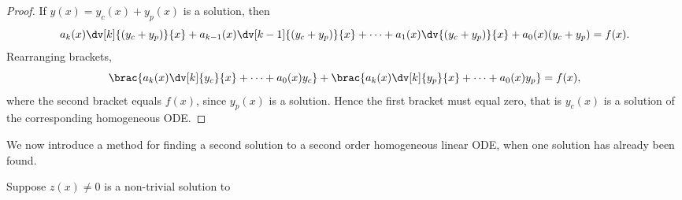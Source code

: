 \begin{proof}
If $y(x)=y_c(x)+y_p(x)$ is a solution, then
\[a_k(x)\dv[k]{(y_c+y_p)}{x}+a_{k-1}(x)\dv[k-1]{(y_c+y_p)}{x}+\cdots+a_1(x)\dv{(y_c+y_p)}{x}+a_0(x)(y_c+y_p)=f(x).\]
Rearranging brackets,
\[\brac{a_k(x)\dv[k]{y_c}{x}+\cdots+a_0(x)y_c}+\brac{a_k(x)\dv[k]{y_p}{x}+\cdots+a_0(x)y_p}=f(x),\]
where the second bracket equals $f(x)$, since $y_p(x)$ is a solution. Hence the first bracket must equal zero, that is $y_c(x)$ is a solution of the corresponding homogeneous ODE.
\end{proof}

We now introduce a method for finding a second solution to a second order homogeneous linear ODE, when one solution has already been found.

Suppose $z(x)\neq0$ is a non-trivial solution to